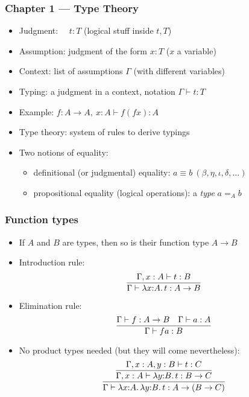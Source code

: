\documentclass[handout]{beamer}
\newcommand{\lamt}[3]{\lambda{#1{:}#2.\,#3}}
\begin{document}
\frame
  {
  
    \frametitle{Chapter 1 --- Type Theory}

    \begin{itemize}[<+->]
    \item Judgment: ~~$t:T$ (logical stuff inside $t,T$)
    \item Assumption: judgment of the form $x:T$ ($x$ a variable)
    \item Context: list of assumptions $\Gamma$ (with different variables)
    \item Typing: a judgment in a context, notation $\Gamma\vdash t:T$
    \item Example: $f:A\to A,~x:A\vdash f(fx):A$
    \item Type theory: system of rules to derive typings
    \item Two notions of equality:
        \begin{itemize}[<+->]
        \item definitional (or judgmental) equality:  $a \equiv b~(\beta,\eta,\iota,\delta,\ldots)$
        \item propositional equality (logical operations): a \emph{type} $a =_A b$
        \end{itemize}
    \end{itemize}
  }

\frame
  {
  
    \frametitle{Function types}

    \begin{itemize}[<+->]
    \item If $A$ and $B$ are types, then so is their function type $A\to B$
    \item Introduction rule: 
\[\infer{\Gamma\vdash\lamt{x}{A}{t}:A\to B}{\Gamma,x:A \vdash t:B}\]
    \item Elimination rule: 
\[\infer{\Gamma\vdash fa:B}{\Gamma\vdash f:A\to B \quad \Gamma\vdash a:A}\]
    \item No product types needed (but they will come nevertheless):
\[\infer{\Gamma\vdash\lamt{x}{A}{\lamt{y}{B}{t}}:A\to(B\to C)}
  {\infer{\Gamma,x:A\vdash \lamt{y}{B}{t} : B\to C}
   {\Gamma,x:A,y:B\vdash t:C}
  }
\]
    \end{itemize}
  }
\end{document}
